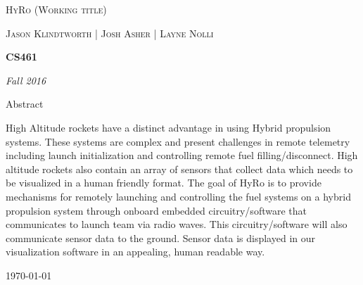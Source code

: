 \documentclass[10pt,draftclsnofoot,onecolumn]{IEEEtran}
\begin{document}
\begin{titlepage}
	\centering
	{\scshape\LARGE HyRo (Working title) \par}
	\vspace{1cm}
	{\scshape\Large Jason Klindtworth  |  Josh Asher  |   Layne Nolli\par}
	\vspace{1.5cm}
	{\huge\bfseries CS461\par}
	\vspace{2cm}
	{\Large\itshape Fall 2016\par}
	\vspace{4cm}
	{\large Abstract\par}
	\vspace{1cm}
	High Altitude rockets have a distinct advantage in using Hybrid propulsion systems. These systems are complex and present challenges in remote telemetry including launch initialization and controlling remote fuel filling/disconnect. High altitude rockets also contain an array of sensors that collect data which needs to be visualized in a human friendly format. The goal of HyRo is to provide mechanisms for remotely launching and controlling the fuel systems on a hybrid propulsion system through onboard embedded circuitry/software that communicates to launch team via radio waves. This circuitry/software will also communicate sensor data to the ground. Sensor data is displayed in our visualization software in an appealing, human readable way. \par

	\vfill

	{\large \today\par}
\end{titlepage}

\end{document}
